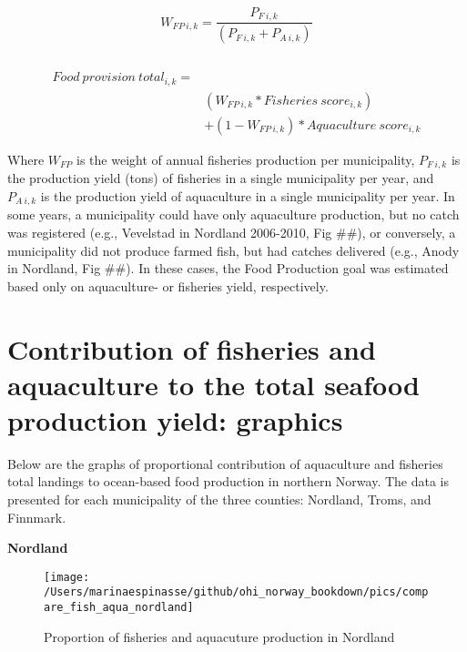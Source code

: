\documentclass[
]{book}
\begin{document}
\begin{equation}
W_{FP\ i, k} = \frac{P_{F\ i,k}}{(P_{F\ i,k} + P_{A\ i,k})}
\label{eq:foodprodw} 
\end{equation}

\[~\]
\[~\]

\begin{equation}
\begin{split}
  Food\ provision\ total_{i,k}  = \\
  & (W_{FP\ i,k} * Fisheries\ score_{i,k})\\
  & + (1 - W_{FP\ i,k}) *Aquaculture\ score_{i,k}  
\end{split}  
  \label{eq:foodprod}  
\end{equation}
\[~\]

Where \(W_{FP}\) is the weight of annual fisheries production per municipality, \(P_{F\ i,k}\) is the production yield (tons) of fisheries in a single municipality per year, and \(P_{A\ i,k}\) is the production yield of aquaculture in a single municipality per year.
In some years, a municipality could have only aquaculture production, but no catch was registered (e.g., Vevelstad in Nordland 2006-2010, Fig \#\#), or conversely, a municipality did not produce farmed fish, but had catches delivered (e.g., Anody in Nordland, Fig \#\#). In these cases, the Food Production goal was estimated based only on aquaculture- or fisheries yield, respectively.

\hypertarget{contribution-of-fisheries-and-aquaculture-to-the-total-seafood-production-yield-graphics}{%
\section{Contribution of fisheries and aquaculture to the total seafood production yield: graphics}\label{contribution-of-fisheries-and-aquaculture-to-the-total-seafood-production-yield-graphics}}

Below are the graphs of proportional contribution of aquaculture and fisheries total landings to ocean-based food production in northern Norway. The data is presented for each municipality of the three counties: Nordland, Troms, and Finnmark.

{\textbf{Nordland}}

\begin{figure}

{\centering \texttt{[image: /Users/marinaespinasse/github/ohi\_norway\_bookdown/pics/compare\_fish\_aqua\_nordland]} 

}

\caption{Proportion of fisheries and aquacuture production in Nordland}\label{fig:fishakva2}
\end{figure}
\end{document}
